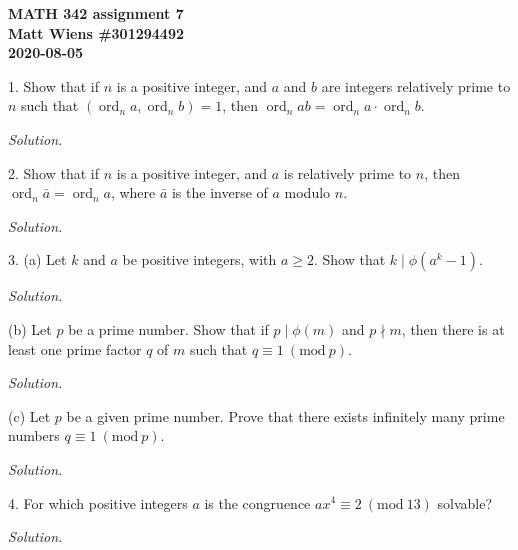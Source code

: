 \documentclass{article}
\newcommand{\Mod}[1]{\ (\mathrm{mod}\ #1)}
\DeclareMathOperator{\ord}{ord}
\begin{document}
\textbf{MATH 342 assignment 7} \\
\textbf{Matt Wiens \#301294492} \\
\textbf{2020-08-05}

1. Show that if $n$ is a positive integer, and $a$ and $b$ are integers
relatively prime to $n$ such that $(\ord_n a, \ord_n b) = 1$, then
$\ord_n ab = \ord_n a \cdot \ord_n b$.

\textit{Solution.}

\newpage

2. Show that if $n$ is a positive integer, and $a$ is relatively prime
to $n$, then $\ord_n \bar{a} = \ord_n a$, where $\bar{a}$ is the inverse
of $a$ modulo $n$.

\textit{Solution.}

\newpage

3. (a) Let $k$ and $a$ be positive integers, with $a \geq 2$. Show
that $k \mid \phi(a^k - 1)$.

\textit{Solution.}

\vspace{5mm}

(b) Let $p$ be a prime number. Show that if $p \mid \phi(m)$ and
$p \nmid m$, then there is at least one prime factor $q$ of $m$
such that $q \equiv 1 \Mod{p}$.

\textit{Solution.}

\vspace{5mm}

(c) Let $p$ be a given prime number. Prove that there exists infinitely
many prime numbers $q \equiv 1 \Mod{p}$.

\textit{Solution.}

\newpage

4. For which positive integers $a$ is the congruence
$a x^4 \equiv 2 \Mod{13}$ solvable?

\textit{Solution.}
\end{document}
